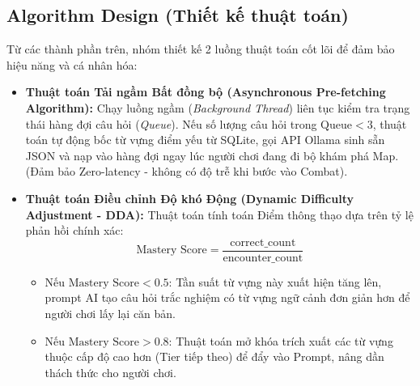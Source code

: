\subsection{Algorithm Design (Thiết kế thuật toán)}
Từ các thành phần trên, nhóm thiết kế 2 luồng thuật toán cốt lõi để đảm bảo hiệu năng và cá nhân hóa:
\begin{itemize}
    \item \textbf{Thuật toán Tải ngầm Bất đồng bộ (Asynchronous Pre-fetching Algorithm):} Chạy luồng ngầm (\textit{Background Thread}) liên tục kiểm tra trạng thái hàng đợi câu hỏi (\textit{Queue}). Nếu số lượng câu hỏi trong $\text{Queue} < 3$, thuật toán tự động bốc từ vựng điểm yếu từ SQLite, gọi API Ollama sinh sẵn JSON và nạp vào hàng đợi ngay lúc người chơi đang đi bộ khám phá Map. (Đảm bảo Zero-latency - không có độ trễ khi bước vào Combat).
    \item \textbf{Thuật toán Điều chỉnh Độ khó Động (Dynamic Difficulty Adjustment - DDA):} Thuật toán tính toán Điểm thông thạo dựa trên tỷ lệ phản hồi chính xác:
    $$\text{Mastery Score} = \frac{\text{correct\_count}}{\text{encounter\_count}}$$
    \begin{itemize}
        \item Nếu $\text{Mastery Score} < 0.5$: Tần suất từ vựng này xuất hiện tăng lên, prompt AI tạo câu hỏi trắc nghiệm có từ vựng ngữ cảnh đơn giản hơn để người chơi lấy lại căn bản.
        \item Nếu $\text{Mastery Score} > 0.8$: Thuật toán mở khóa trích xuất các từ vựng thuộc cấp độ cao hơn (Tier tiếp theo) để đẩy vào Prompt, nâng dần thách thức cho người chơi.
    \end{itemize}
\end{itemize}